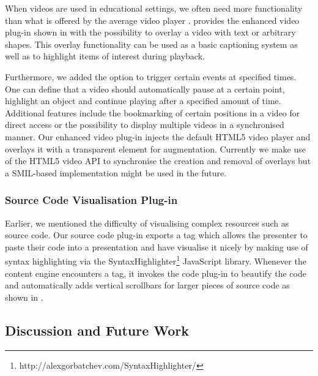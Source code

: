 \documentclass[a4paper,12pt]{report}
\begin{document}
     When videos are used in educational settings, we often need more
     functionality than what is offered by the average video player
     \citep{reuss-1}. \mxp provides the enhanced video plug-in shown in
      with the possibility to overlay a video with text or
     arbitrary shapes. This overlay functionality can be used as a basic
     captioning system as well as to highlight items of interest during
     playback.

     Furthermore, we added the option to trigger certain events at specified
     times. One can define that a video should automatically pause at a certain
     point, highlight an object and continue playing after a specified amount
     of time. Additional features include the bookmarking of certain positions
     in a video for direct access or the possibility to display multiple videos
     in a synchronised manner. Our enhanced video plug-in injects the default
     HTML5 video player and overlays it with a transparent  element
     for augmentation. Currently we make use of the HTML5 video API to
     synchronise the creation and removal of overlays but a SMIL-based
     implementation might be used in the future.


    \subsubsection{Source Code Visualisation Plug-in}

     Earlier, we mentioned the difficulty of visualising complex resources such
     as source code. Our \mxp source code plug-in exports a  tag
     which allows the presenter to paste their code into a presentation and
     have \mxp visualise it nicely by making use of syntax highlighting via the
     SyntaxHighlighter\footnote{http://alexgorbatchev.com/SyntaxHighlighter/}
     JavaScript library. Whenever the content engine encounters a 
     tag, it invokes the code plug-in to beautify the code and automatically
     adds vertical scrollbars for larger pieces of source code as shown in
     .


   \subsection{Discussion and Future Work}
\end{document}
